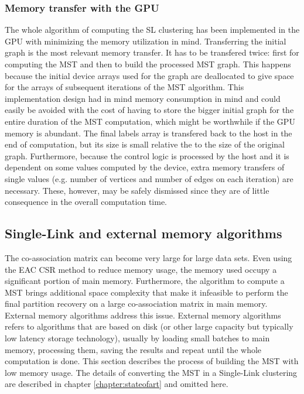 \subsubsection{Memory transfer with the GPU}
The whole algorithm of computing the SL clustering has been implemented in the GPU with minimizing the memory utilization in mind.
Transferring the initial graph is the most relevant memory transfer.
It has to be transfered twice: first for computing the MST and then to build the processed MST graph.
This happens because the initial device arrays used for the graph are deallocated to give space for the arrays of subsequent iterations of the MST algorithm.
This implementation design had in mind memory consumption in mind and could easily be avoided with the cost of having to store the bigger initial graph for the entire duration of the MST computation, which might be worthwhile if the GPU memory is abundant.
The final labels array is transfered back to the host in the end of computation, but its size is small relative the to the size of the original graph.
Furthermore, because the control logic is processed by the host and it is dependent on some values computed by the device, extra memory transfers of single values (e.g. number of vertices and number of edges on each iteration) are necessary.
These, however, may be safely dismissed since they are of little consequence in the overall computation time.


\subsection{Single-Link and external memory algorithms}
\label{sec:sl disk}


The co-association matrix can become very large for large data sets.
Even using the EAC CSR method to reduce memory usage, the memory used occupy a significant portion of main memory.
Furthermore, the algorithm to compute a MST brings additional space complexity that make it infeasible to perform the final partition recovery on a large co-association matrix in main memory.
External memory algorithms address this issue.
External memory algorithms refers to algorithms that are based on disk (or other large capacity but typically low latency storage technology), usually by loading small batches to main memory, processing them, saving the results and repeat until the whole computation is done.
This section describes the process of building the MST with low memory usage.
The details of converting the MST in a Single-Link clustering are described in chapter \ref{chapter:stateofart} and omitted here.

